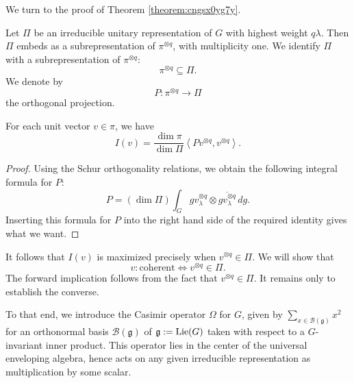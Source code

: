 \documentclass[reqno]{amsart} 
\begin{document}
We turn to the proof of Theorem \ref{theorem:cngsx0yg7y}.

Let $\Pi$ be an irreducible unitary representation of $G$ with highest weight $q \lambda$.  Then $\Pi$ embeds as a subrepresentation of $\pi^{\otimes q}$, with multiplicity one.  We identify $\Pi$ with a subrepresentation of $\pi^{\otimes q}$:
\begin{equation*}
  \pi^{\otimes q} \subseteq \Pi. 
\end{equation*}
We denote by
\begin{equation*}
  P : \pi^{\otimes q} \rightarrow \Pi
\end{equation*}
the orthogonal projection.
\begin{lemma}
  For each unit vector $v \in \pi$, we have
  \begin{equation*}
    I(v) = \frac{\dim \pi}{\dim \Pi}
    \left\langle P v^{\otimes q}, v^{\otimes q} \right\rangle.
  \end{equation*}
\end{lemma}
\begin{proof}
  Using the Schur orthogonality relations, we obtain the following integral formula for $P$:
  \begin{equation*}
    P =(\dim \Pi) \int_{G} g v_\lambda^{\otimes q}
    \otimes \overline{g v_\lambda^{\otimes q}} \, d g. 
  \end{equation*}
  Inserting this formula for $P$ into the right hand side of the required identity gives what we want.
\end{proof}

It follows that $I(v)$ is maximized precisely when $v^{\otimes q} \in \Pi$.  We will show that
\begin{equation}\label{eq:cngsx4hl1k}
  v:\text{coherent} \iff v^{\otimes q} \in \Pi.
\end{equation}
The forward implication follows from the fact that $v^{\otimes q} \in \Pi$.  It remains only to establish the converse.

To that end, we introduce the Casimir operator $\Omega$ for $G$, given by $\sum_{x \in \mathcal{B}(\mathfrak{g})} x^2$ for an orthonormal basis $\mathcal{B}(\mathfrak{g})$ of $\mathfrak{g} := \operatorname{Lie}(G)$ taken with respect to a $G$-invariant inner product.  This operator lies in the center of the universal enveloping algebra, hence acts on any given irreducible representation as multiplication by some scalar.
\end{document}
